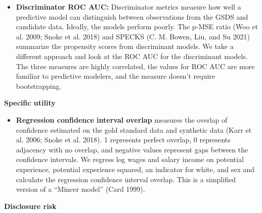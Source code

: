 \documentclass[
]{urban-formatting}
\providecommand{\tightlist}{%
  \setlength{\itemsep}{0pt}\setlength{\parskip}{0pt}}\usepackage{longtable,booktabs,array}
\begin{document}
\begin{itemize}
{  numeric variables:} For all numeric variables, calculate a Pearson's
  linear correlation matrix on the GSDS and candidate data. Difference
  the lower triangle of the matrix for the GSDS and the matrix for the
  candidate file. Calculate the mean absolute error.
\item
  \textbf{Discriminator ROC AUC:} Discriminator metrics measure how well
  a predictive model can distinguish between observations from the GSDS
  and candidate data. Ideally, the models perform poorly. The p-MSE
  ratio (Woo et al. 2009; Snoke et al. 2018) and SPECKS (C. M. Bowen,
  Liu, and Su 2021) summarize the propensity scores from discriminant
  models. We take a different approach and look at the ROC AUC for the
  discriminant models. The three measures are highly correlated, the
  values for ROC AUC are more familiar to predictive modelers, and the
  measure doesn't require bootstrapping.
\end{itemize}

\textbf{Specific utility}

\begin{itemize}
\tightlist
\item
  \textbf{Regression confidence interval overlap} measures the overlap
  of confidence estimated on the gold standard data and synthetic data
  (Karr et al. 2006; Snoke et al. 2018). 1 represents perfect overlap, 0
  represents adjacency with no overlap, and negative values represent
  gaps between the confidence intervals. We regress log wages and salary
  income on potential experience, potential experience squared, an
  indicator for white, and sex and calculate the regression confidence
  interval overlap. This is a simplified version of a ``Mincer model''
  (Card 1999).
\end{itemize}

\textbf{Disclosure risk}
\end{document}
